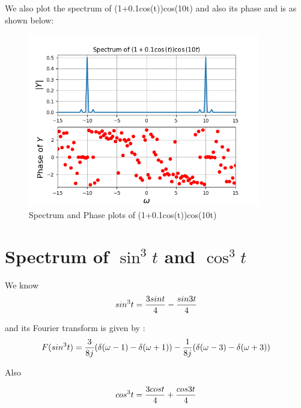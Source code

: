 \documentclass[10pt,a4paper]{article}
\begin{document}
We also plot the spectrum of (1+0.1cos(t))cos(10t) and also its phase and is as shown below:

\begin{figure}[!tbh]

\includegraphics[width = 0.9\textwidth]{1-spectrum of AM wave (high no of samples).png}
\caption{Spectrum and Phase plots of (1+0.1cos(t))cos(10t)}

\end{figure}

\section{Spectrum of $\sin^{3} t$ and $\cos^{3} t$}

We know \\ 

\begin{equation*}
 \\sin^{3} t = \frac{3\\sin t}{4} - \frac{\\sin 3t}{4}
\end{equation*}

and its Fourier transform is given by : \\

\begin{equation*}
F(\\sin^{3} t) = \frac{3}{8j}(\delta (\omega - 1) - \delta (\omega + 1)) - \frac{1}{8j}(\delta (\omega - 3) - \delta (\omega + 3))
\end{equation*} 

Also 

\begin{equation*}
 \\cos^{3} t = \frac{3\\cos t}{4} + \frac{\\cos 3t}{4}
\end{equation*}
\end{document}
